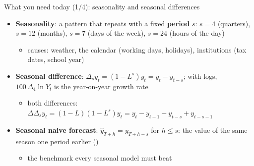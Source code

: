\begin{frame}{What you need today (1/4): seasonality and seasonal differences}
\itemsize{\small}
\begin{itemize}
    \item \textbf{Seasonality}: a pattern that repeats with a fixed \textbf{period} $s$: $s = 4$ (quarters), $s = 12$ (months), $s = 7$ (days of the week), $s = 24$ (hours of the day)
    \begin{itemize}
        \item causes: weather, the calendar (working days, holidays), institutions (tax dates, school year)
    \end{itemize}
    \item \textbf{Seasonal difference}: $\Delta_s y_t = (1 - L^s)y_t = y_t - y_{t-s}$; with logs, $100\,\Delta_4\ln Y_t$ is the year-on-year growth rate
    \begin{itemize}
        \item both differences: $\Delta\Delta_s y_t = (1 - L)(1 - L^s)y_t = y_t - y_{t-1} - y_{t-s} + y_{t-s-1}$
    \end{itemize}
    \item \textbf{Seasonal naive forecast}: $\hat y_{T+h} = y_{T+h-s}$ for $h \le s$: the value of the same season one period earlier ()
    \begin{itemize}
        \item the benchmark every seasonal model must beat
    \end{itemize}
\end{itemize}
\end{frame}

